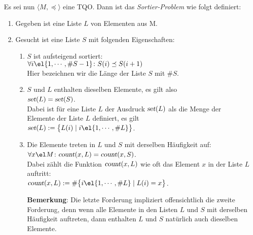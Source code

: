 Es sei nun $\langle M, \preceq \rangle$ eine \textsc{TQO}.  Dann ist das \emph{Sortier-Problem} wie
folgt definiert:
\begin{enumerate}
\item Gegeben ist eine Liste $L$ von Elementen aus M.
\item Gesucht ist eine Liste $S$ mit folgenden Eigenschaften: 
  \begin{enumerate}
  \item $S$ ist aufsteigend sortiert: \\[0.1cm]
        \hspace*{1.3cm} 
        $\forall i \el \{ 1, \cdots, \#S-1 \} \colon S(i) \preceq S(i+1)$ \\[0.1cm]
        Hier bezeichnen wir die L\"ange der Liste $S$ mit $\#S$.
  \item $S$ und $L$ enthalten dieselben Elemente, es gilt also \\[0.1cm]
        \hspace*{1.3cm} 
        $\textsl{set}(L) = \textsl{set}(S)$. \\[0.1cm]
        Dabei ist f\"ur eine Liste $L$ der Ausdruck $\textsl{set}(L)$ als die Menge
        der Elemente der Liste $L$ definiert, es gilt \\[0.1cm]
        \hspace*{1.3cm} 
        $\textsl{set}(L) := \bigl\{ L(i) \mid i \el \{ 1, \cdots, \#L\} \bigr\}$.
  \item Die Elemente treten in $L$ und $S$ mit derselben H\"aufigkeit auf: \\[0.1cm]
        \hspace*{1.3cm} 
        $\forall x\el M \colon \textsl{count}(x,L) = \textsl{count}(x,S)$.
        \\[0.1cm]
        Dabei z\"ahlt die Funktion $\textsl{count}(x,L)$ wie oft das Element $x$ in der
        Liste $L$ auftritt: \\[0.1cm]
        \hspace*{1.3cm}
        $\textsl{count}(x,L) := \# \bigl\{ i \el \{1,\cdots,\#L\} \mid L(i) = x \bigr\}$.

        \textbf{Bemerkung}: Die letzte Forderung impliziert offensichtlich die zweite
        Forderung, denn wenn alle Elemente in den Listen $L$ und $S$ mit derselben
        H\"aufigkeit auftreten, dann enthalten $L$ und $S$ nat\"urlich auch dieselben Elemente.
  \end{enumerate}
\end{enumerate}

